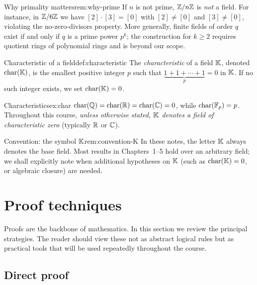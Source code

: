 \begin{remark}{Why primality matters}{rem:why-prime}
If $n$ is not prime, ${\mathbb{Z}}/n{\mathbb{Z}}$ is \emph{not} a field. For instance, in
${\mathbb{Z}}/6{\mathbb{Z}}$ we have $[2]\cdot[3]=[0]$ with $[2]\neq[0]$ and $[3]\neq[0]$,
violating the no-zero-divisors property. More generally, finite fields of
order $q$ exist if and only if $q$ is a prime power $p^k$; the
construction for $k\geq 2$ requires quotient rings of polynomial rings and
is beyond our scope.
\end{remark}

\begin{definition}{Characteristic of a field}{def:characteristic}
The \emph{characteristic} of a field ${\mathbb{K}}$, denoted
$\operatorname{char}({\mathbb{K}})$, is the smallest positive integer $p$ such that
$\underbrace{1+1+\cdots+1}_{p} = 0$ in ${\mathbb{K}}$. If no such integer exists,
we set $\operatorname{char}({\mathbb{K}})=0$.
\end{definition}

\begin{example}{Characteristics}{ex:char}
$\operatorname{char}({\mathbb{Q}}) = \operatorname{char}({\mathbb{R}}) = \operatorname{char}({\mathbb{C}}) = 0$, while $\operatorname{char}({\mathbb{F}}_p) = p$.
Throughout this course, \emph{unless otherwise stated, ${\mathbb{K}}$ denotes a
field of characteristic zero} (typically ${\mathbb{R}}$ or ${\mathbb{C}}$).
\end{example}

\begin{remark}{Convention: the symbol ${\mathbb{K}}$}{rem:convention-K}
In these notes, the letter ${\mathbb{K}}$ always denotes the base field. Most
results in Chapters~1--5 hold over an arbitrary field; we shall
explicitly note when additional hypotheses on ${\mathbb{K}}$ (such as
$\operatorname{char}({\mathbb{K}})=0$, or algebraic closure) are needed.
\end{remark}


\section{Proof techniques}\label{sec:proofs}

Proofs are the backbone of mathematics. In this section we review the
principal strategies. The reader should view these not as abstract logical
rules but as practical tools that will be used repeatedly throughout the
course.

\subsection{Direct proof}\label{subsec:direct}

